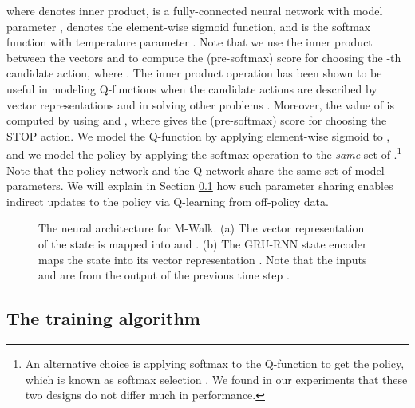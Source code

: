 \documentclass{article}
\newcommand{\modelname}{M-Walk}
\begin{document}
	where  denotes inner product,  is a fully-connected neural network with model parameter ,  denotes the element-wise sigmoid function, and  is the softmax function with temperature parameter . Note that we use the inner product between the vectors  and  to compute the (pre-softmax) score  for choosing the -th candidate action, where . The inner product operation has been shown to be useful in modeling Q-functions when the candidate actions are described by vector representations \cite{he2015deep,chen2017q} and in solving other problems \cite{vinyals2015pointer,bello2016neural}. Moreover, the value of  is computed by  using  and , where  gives the (pre-softmax) score for choosing the STOP action. We model the Q-function by applying element-wise sigmoid to , and we model the policy by applying the softmax operation to the \emph{same} set of .\footnote{An alternative choice is applying softmax to the Q-function to get the policy, which is known as softmax selection \cite{sutton1998reinforcement}. We found in our experiments that these two designs do not differ much in performance.} Note that the policy network and the Q-network share the same set of model parameters. We will explain in Section \ref{Sec:\modelname:Training} how such parameter sharing enables indirect updates to the policy  via Q-learning from off-policy data. 
	
	
	
	\begin{figure}[t!]
		\centering
		\hfil
		\caption{{\small The neural architecture for \modelname. (a) The vector representation of the state is mapped into  and . (b) The GRU-RNN state encoder maps the state into its vector representation . Note that the inputs  and  are from the output of the previous time step .}}
		\label{fig:DeepRNN}
	\end{figure}
	
	
	
	
	
\subsection{The training algorithm}
\label{Sec:\modelname:Training}
	
\end{document}
